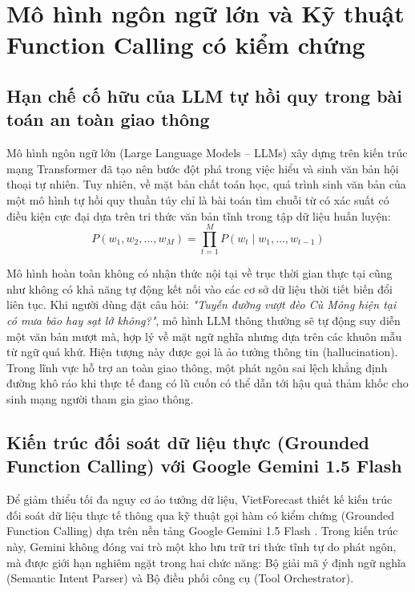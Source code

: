 \section{Mô hình ngôn ngữ lớn và Kỹ thuật Function Calling có kiểm chứng}

\subsection{Hạn chế cố hữu của LLM tự hồi quy trong bài toán an toàn giao thông}

Mô hình ngôn ngữ lớn (Large Language Models -- LLMs) xây dựng trên kiến trúc mạng Transformer \cite{vaswani2017attention} đã tạo nên bước đột phá trong việc hiểu và sinh văn bản hội thoại tự nhiên. Tuy nhiên, về mặt bản chất toán học, quá trình sinh văn bản của một mô hình tự hồi quy thuần túy chỉ là bài toán tìm chuỗi từ có xác suất có điều kiện cực đại dựa trên tri thức văn bản tĩnh trong tập dữ liệu huấn luyện:
\begin{equation}
\label{eq:llm_prob_vi}
P(w_1, w_2, \dots, w_M) = \prod_{t=1}^{M} P(w_t \mid w_1, \dots, w_{t-1})
\end{equation}

Mô hình hoàn toàn không có nhận thức nội tại về trục thời gian thực tại cũng như không có khả năng tự động kết nối vào các cơ sở dữ liệu thời tiết biến đổi liên tục. Khi người dùng đặt câu hỏi: \textit{"Tuyến đường vượt đèo Cù Mông hiện tại có mưa bão hay sạt lở không?"}, mô hình LLM thông thường sẽ tự động suy diễn một văn bản mượt mà, hợp lý về mặt ngữ nghĩa nhưng dựa trên các khuôn mẫu từ ngữ quá khứ. Hiện tượng này được gọi là ảo tưởng thông tin (hallucination). Trong lĩnh vực hỗ trợ an toàn giao thông, một phát ngôn sai lệch khẳng định đường khô ráo khi thực tế đang có lũ cuốn có thể dẫn tới hậu quả thảm khốc cho sinh mạng người tham gia giao thông.

\subsection{Kiến trúc đối soát dữ liệu thực (Grounded Function Calling) với Google Gemini 1.5 Flash}

Để giảm thiểu tối đa nguy cơ ảo tưởng dữ liệu, VietForecast thiết kế kiến trúc đối soát dữ liệu thực tế thông qua kỹ thuật gọi hàm có kiểm chứng (Grounded Function Calling) dựa trên nền tảng Google Gemini 1.5 Flash \cite{gemini2024flash}. Trong kiến trúc này, Gemini không đóng vai trò một kho lưu trữ tri thức tĩnh tự do phát ngôn, mà được giới hạn nghiêm ngặt trong hai chức năng: Bộ giải mã ý định ngữ nghĩa (Semantic Intent Parser) và Bộ điều phối công cụ (Tool Orchestrator).

